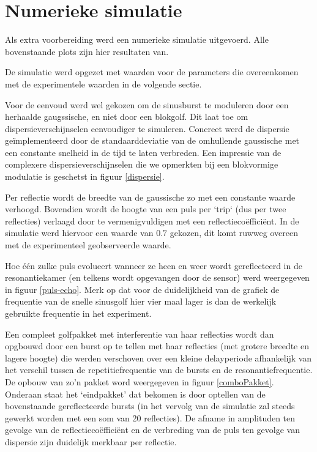 \section{Numerieke simulatie}
Als extra voorbereiding werd een numerieke simulatie uitgevoerd. Alle 
bovenstaande plots zijn hier resultaten van.

De simulatie werd opgezet met waarden voor de parameters die overeenkomen 
met de experimentele waarden in de volgende sectie.

Voor de eenvoud werd wel gekozen om de sinusburst te moduleren door een 
herhaalde gaugssische, en niet door een blokgolf. Dit laat toe om 
dispersieverschijnselen eenvoudiger te simuleren. Concreet werd de 
dispersie ge\"implementeerd door de standaarddeviatie van de omhullende 
gaussische met een constante snelheid in de tijd te laten verbreden. Een 
impressie van de complexere dispersieverschijnselen die we opmerkten bij 
een blokvormige modulatie is geschetst in figuur \ref{dispersie}.

Per reflectie wordt de breedte van de gaussische zo met een constante 
waarde verhoogd. Bovendien wordt de hoogte van een puls per `trip` (dus per 
twee reflecties) verlaagd door te vermenigvuldigen met een 
reflectieco\"effici\"ent. In de simulatie werd hiervoor een waarde van 
$0.7$ gekozen, dit komt ruwweg overeen met de experimenteel geobserveerde 
waarde.

Hoe \'e\'en zulke puls evolueert wanneer ze heen en weer wordt 
gereflecteerd in de resonantiekamer (en telkens wordt opgevangen door de 
sensor) werd weergegeven in figuur \ref{puls-echo}. Merk op dat voor de 
duidelijkheid van de grafiek de frequentie van de snelle sinusgolf hier 
vier maal lager is dan de werkelijk gebruikte frequentie in het experiment.

Een compleet golfpakket met interferentie van haar reflecties wordt dan 
opgbouwd door een burst op te tellen met haar reflecties (met grotere 
breedte en lagere hoogte) die werden verschoven over een kleine 
delayperiode afhankelijk van het verschil tussen de repetitiefrequentie van 
de bursts en de resonantiefrequentie. De opbouw van zo'n pakket word 
weergegeven in figuur \ref{comboPakket}. Onderaan staat het `eindpakket' 
dat bekomen is door optellen van de bovenstaande gereflecteerde bursts (in 
het vervolg van de simulatie zal steeds gewerkt worden met een som van 20 
reflecties). De afname in amplituden ten gevolge van de 
reflectieco\"effici\"ent en de verbreding van de puls ten gevolge van 
dispersie zijn duidelijk merkbaar per reflectie.


